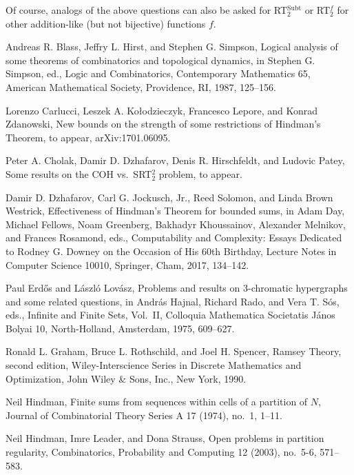 \documentclass{amsart}
\theoremstyle{definition}
\DeclareMathOperator{\subt}{Subt}
\begin{document}
Of course, analogs of the above questions can also be asked for
RT$^{\subt}_2$ or RT$^f_2$ for other addition-like (but not bijective)
functions $f$.


\begin{thebibliography}{99}

 Andreas R. Blass, Jeffry L. Hirst, and Stephen G. Simpson,
Logical analysis of some theorems of combinatorics and topological
dynamics, in Stephen G. Simpson, ed., Logic and Combinatorics,
Contemporary Mathematics 65, American Mathematical Society,
Providence, RI, 1987, 125--156.

 Lorenzo Carlucci, Leszek A. Ko\l{}odzieczyk, Francesco
Lepore, and Konrad Zdanowski, New bounds on the strength of some
restrictions of Hindman's Theorem, to appear, arXiv:1701.06095.

 Peter A. Cholak, Damir D. Dzhafarov, Denis
R. Hirschfeldt, and Ludovic Patey, Some results on the COH
vs.\ SRT$^2_2$ problem, to appear.

 Damir D. Dzhafarov, Carl G. Jockusch, Jr., Reed
Solomon, and Linda Brown Westrick, Effectiveness of Hindman's
Theorem for bounded sums, in Adam Day, Michael Fellows, Noam
Greenberg, Bakhadyr Khoussainov, Alexander Melnikov, and Frances
Rosamond, eds., Computability and Complexity: Essays Dedicated to
Rodney G. Downey on the Occasion of His 60th Birthday, Lecture Notes
in Computer Science 10010, Springer, Cham, 2017, 134--142.

 Paul Erd{\H o}s and L{\' a}szl{\' o} Lov{\' a}sz,
Problems and results on 3-chromatic hypergraphs and some related
questions, in Andr{\' a}s Hajnal, Richard Rado, and Vera T. S{\'
o}s, eds., Infinite and Finite Sets, Vol.\ II, Colloquia
Mathematica Societatis J{\' a}nos Bolyai 10, North-Holland,
Amsterdam, 1975, 609--627.

 Ronald L. Graham, Bruce L. Rothschild, and Joel H. Spencer,
Ramsey Theory, second edition, Wiley-Interscience Series in Discrete
Mathematics and Optimization, John Wiley \& Sons, Inc., New York, 1990.

 Neil Hindman, Finite sums from sequences within
cells of a partition of $N$, Journal of Combinatorial Theory Series A
17 (1974), no.\ 1, 1--11.

 Neil Hindman, Imre Leader, and Dona Strauss, Open
problems in partition regularity, Combinatorics, Probability and
Computing 12 (2003), no.\ 5-6, 571--583.


\end{thebibliography}
\end{document}
